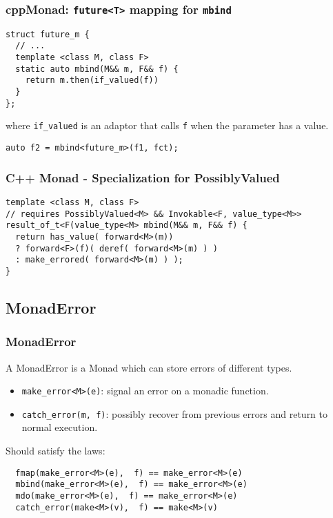 \documentclass[xcolor=dvipsnames]{beamer}
\newcommand{\cpp}[1]{\lstinline{#1}}
\begin{document}
\begin{frame}[fragile]
\frametitle{cpp{Monad}: \cpp{future<T>} mapping for \cpp{mbind}}

\begin{lstlisting}
struct future_m {
  // ...
  template <class M, class F>
  static auto mbind(M&& m, F&& f) {
    return m.then(if_valued(f))
  }
};
\end{lstlisting}

where \cpp{if_valued} is an adaptor that calls \cpp{f} when the parameter has a value.  

\begin{lstlisting}
auto f2 = mbind<future_m>(f1, fct); 
\end{lstlisting}

\end{frame}
\begin{frame}[fragile]
\frametitle{C++ Monad - Specialization for PossiblyValued}
       
\begin{lstlisting}
template <class M, class F>
// requires PossiblyValued<M> && Invokable<F, value_type<M>>
result_of_t<F(value_type<M> mbind(M&& m, F&& f) {
  return has_value( forward<M>(m))
  ? forward<F>(f)( deref( forward<M>(m) ) )
  : make_errored( forward<M>(m) ) );
}
\end{lstlisting}
         
\end{frame}
\subsection{MonadError}
\begin{frame}[fragile]
\frametitle{MonadError}

A MonadError is a Monad which can store errors of different types.

\begin{itemize}
  \item \cpp{make_error<M>(e)}: signal an error on a monadic function.
  \item \cpp{catch_error(m, f)}: possibly recover from previous errors and return to normal execution.
\end{itemize}

Should satisfy the laws:

\begin{lstlisting}
  fmap(make_error<M>(e),  f) == make_error<M>(e)
  mbind(make_error<M>(e),  f) == make_error<M>(e)
  mdo(make_error<M>(e),  f) == make_error<M>(e)
  catch_error(make<M>(v),  f) == make<M>(v)
\end{lstlisting}
\end{frame}
\end{document}
